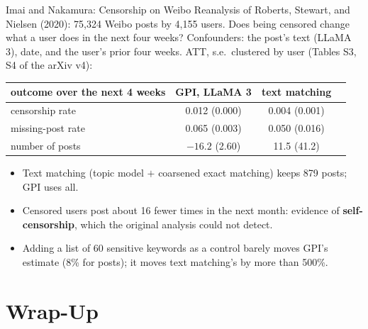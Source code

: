\documentclass[aspectratio=169,11pt,xcolor=dvipsnames]{beamer}
\newcommand{\srct}[1]{#1}
\begin{document}
\begin{frame}{Imai and Nakamura: Censorship on Weibo}
Reanalysis of \srct{Roberts, Stewart, and Nielsen (2020)}: 75,324 Weibo posts by 4,155 users.
Does being censored change what a user does in the next four weeks? Confounders: the post's text
(LLaMA 3), date, and the user's prior four weeks. ATT, s.e.\ clustered by user (Tables S3, S4 of the arXiv v4):
\begin{center}\small
\renewcommand{\arraystretch}{1.12}
\begin{tabular}{@{}lccc@{}}
\toprule
outcome over the next 4 weeks & GPI, LLaMA 3 & text matching \\
\midrule
censorship rate & 0.012 (0.000) & 0.004 (0.001) \\
missing-post rate & 0.065 (0.003) & 0.050 (0.016) \\
number of posts & $-16.2$ (2.60) & 11.5 (41.2) \\
\bottomrule
\end{tabular}
\end{center}
\vskip2pt
\begin{itemize}\itemsep2pt\small
  \item Text matching (topic model $+$ coarsened exact matching) keeps 879 posts; GPI uses all.
  \item Censored users post about 16 fewer times in the next month: evidence of
        \textbf{self-censorship}, which the original analysis could not detect.
  \item Adding a list of 60 sensitive keywords as a control barely moves GPI's estimate
        (8\% for posts); it moves text matching's by more than 500\%.
\end{itemize}
\end{frame}

\section[Wrap-Up]{Wrap-Up}
\begin{frame}\sectionpage\end{frame}
\end{document}
